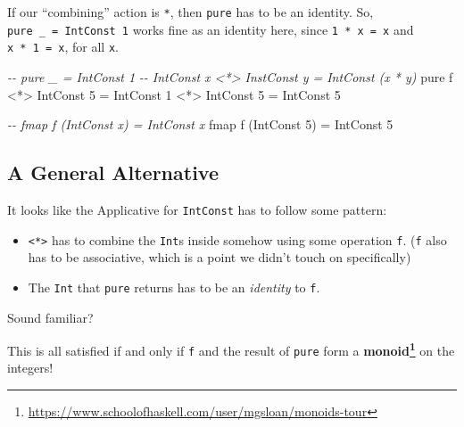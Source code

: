 \documentclass[]{article}
\newenvironment{Shaded}{}{}
\newcommand{\CommentTok}[1]{\textcolor[rgb]{0.38,0.63,0.69}{\textit{#1}}}
\newcommand{\DataTypeTok}[1]{\textcolor[rgb]{0.56,0.13,0.00}{#1}}
\newcommand{\DecValTok}[1]{\textcolor[rgb]{0.25,0.63,0.44}{#1}}
\newcommand{\FunctionTok}[1]{\textcolor[rgb]{0.02,0.16,0.49}{#1}}
\newcommand{\NormalTok}[1]{#1}
\newcommand{\OperatorTok}[1]{\textcolor[rgb]{0.40,0.40,0.40}{#1}}
\newcommand{\OtherTok}[1]{\textcolor[rgb]{0.00,0.44,0.13}{#1}}
\renewcommand{\href}[2]{#2\footnote{\url{#1}}}
\begin{document}
If our ``combining'' action is \texttt{*}, then \texttt{pure} has to be an
identity. So, \texttt{pure\ \_\ =\ IntConst\ 1} works fine as an identity here,
since \texttt{1\ *\ x\ =\ x} and \texttt{x\ *\ 1\ =\ x}, for all \texttt{x}.

\begin{Shaded}
\begin{Highlighting}[]
\CommentTok{{-}{-} pure \_                     = IntConst 1}
\CommentTok{{-}{-} IntConst x <*> InstConst y = IntConst (x * y)}
\FunctionTok{pure}\NormalTok{ f }\OperatorTok{<*>} \DataTypeTok{IntConst} \DecValTok{5} \OtherTok{=} \DataTypeTok{IntConst} \DecValTok{1} \OperatorTok{<*>} \DataTypeTok{IntConst} \DecValTok{5}
                      \OtherTok{=} \DataTypeTok{IntConst} \DecValTok{5}
\end{Highlighting}
\end{Shaded}

\begin{Shaded}
\begin{Highlighting}[]
\CommentTok{{-}{-} fmap f (IntConst x) = IntConst x}
\FunctionTok{fmap}\NormalTok{ f (}\DataTypeTok{IntConst} \DecValTok{5}\NormalTok{) }\OtherTok{=} \DataTypeTok{IntConst} \DecValTok{5}
\end{Highlighting}
\end{Shaded}

\hypertarget{a-general-alternative}{%
\subsection{A General Alternative}\label{a-general-alternative}}

It looks like the Applicative for \texttt{IntConst} has to follow some pattern:

\begin{itemize}
\tightlist
\item
  \texttt{\textless{}*\textgreater{}} has to combine the \texttt{Int}s inside
  somehow using some operation \texttt{f}. (\texttt{f} also has to be
  associative, which is a point we didn't touch on specifically)
\item
  The \texttt{Int} that \texttt{pure} returns has to be an \emph{identity} to
  \texttt{f}.
\end{itemize}

Sound familiar?

This is all satisfied if and only if \texttt{f} and the result of \texttt{pure}
form a
\textbf{\href{https://www.schoolofhaskell.com/user/mgsloan/monoids-tour}{monoid}}
on the integers!
\end{document}
